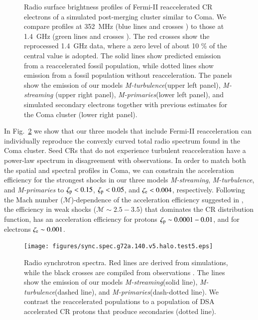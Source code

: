 \documentclass[useAMS,usenatbib]{mn2e}
\newcommand{\Mstream}{{\it M-streaming}\xspace}
\newcommand{\Mflatturb}{{\it M-turbulence}\xspace}
\newcommand{\Mprimary}{{\it M-primaries}\xspace}
\begin{document}
\begin{figure}
\begin{minipage}{1\columnwidth}
\begin{center}
   \end{center}
\end{minipage}
\caption{Radio surface brightness profiles of Fermi-II reaccelerated
    CR electrons of a simulated post-merging cluster similar to
    Coma. We compare profiles at 352~MHz (blue lines and crosses
    \citet{brown11}) to those at 1.4~GHz (green lines and crosses
    \citet{deiss97}). The red crosses show the reprocessed 1.4~GHz
    data, where a zero level of about 10 \% of the central value is
    adopted. The solid lines show predicted emission from a
    reaccelerated fossil population, while dotted lines show emission
    from a fossil population without reacceleration. The panels show
    the emission of our models \Mflatturb (upper left panel), \Mstream
    (upper right panel), \Mprimary (lower left panel), and simulated
    secondary electrons together with previous estimates
    \citet{brunetti12} for the Coma cluster (lower right panel).}
  \label{fig:sync_profile}
\end{figure}

In Fig.~\ref{fig:sync_spectrum} we show that our three models that
include Fermi-II reacceleration can individually reproduce the
convexly curved total radio spectrum found in the Coma cluster. Seed
CRs that do not experience turbulent reacceleration have a power-law
spectrum in disagreement with observations. In order to match both the
spatial and spectral profiles in Coma, we can constrain the
acceleration efficiency for the strongest shocks in our three models
\Mstream, \Mflatturb, and \Mprimary to $\zeta_{{\mathrm{p}}} < 0.15$,
$\zeta_{{\mathrm{p}}}<0.05$, and $\zeta_{{\mathrm{e}}} <0.004$,
respectively. Following the Mach number ($\mathcal{M}$)-dependence of
the acceleration efficiency suggested in \cite{pinzke13}, the
efficiency in weak shocks ($\mathcal{M}\sim 2.5-3.5$) that dominates
the CR distribution function, has an acceleration efficiency for
protons $\zeta_{{\mathrm{p}}}\sim0.0001-0.01$, and for electrons
$\zeta_{{\mathrm{e}}}\sim 0.001$.

\begin{figure}
  \texttt{[image: figures/sync.spec.g72a.140.v5.halo.test5.eps]}
  \caption{Radio synchrotron spectra. Red lines are derived from
    simulations, while the black crosses are compiled from
    observations \citet{2010PhDT.......259P}. The lines show the
    emission of our models \Mstream (solid line), \Mflatturb (dashed
    line), and \Mprimary (dash-dotted line). We contrast the
    reaccelerated populations to a population of DSA accelerated CR
    protons that produce secondaries (dotted line).}
  \label{fig:sync_spectrum}
\end{figure}
\end{document}
